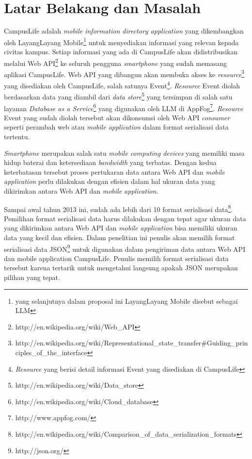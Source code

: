 \documentclass[a4paper, 12pt]{report}
\begin{document}
\section*{Latar Belakang dan Masalah}
\onehalfspacing CampusLife adalah \textit{mobile information directory application} yang dikembangkan oleh LayangLayang Mobile\footnote{yang selanjutnya dalam proposal ini LayangLayang Mobile disebut sebagai LLM} untuk menyediakan informasi yang relevan kepada civitas kampus. Setiap informasi yang ada di CampusLife akan didistribusikan melalui Web API\footnote{http://en.wikipedia.org/wiki/Web\_API} ke seluruh pengguna \textit{smartphone} yang sudah memasang aplikasi CampusLife. Web API yang dibangun akan membuka akses ke \textit{resource}\footnote{http://en.wikipedia.org/wiki/Representational\_state\_transfer\#Guiding\_principles\_of\_the\_interface} yang disediakan oleh CampusLife, salah satunya Event\footnote{\textit{Resource} yang berisi detail informasi Event yang disediakan di CampusLife}. \textit{Resource} Event diolah berdasarkan data yang diambil dari \textit{data store}\footnote{http://en.wikipedia.org/wiki/Data\_store} yang tersimpan di salah satu layanan \textit{Database as a Service}\footnote{http://en.wikipedia.org/wiki/Cloud\_database} yang digunakan oleh LLM di AppFog\footnote{http://www.appfog.com/}. \textit{Resource} Event yang sudah diolah tersebut akan dikonsumsi oleh Web API \textit{consumer} seperti perambah web atau \textit{mobile application} dalam format serialisasi data tertentu.

\onehalfspacing \textit{Smartphone} merupakan salah satu \textit{mobile computing devices} yang memiliki masa hidup baterai dan ketersediaan \textit{bandwidth} yang terbatas.\cite{challenging-issues-and-limitations-of-mobile-computing} Dengan kedua keterbatasan tersebut proses pertukaran data antara Web API dan \textit{mobile application} perlu dilakukan dengan efisien dalam hal ukuran data yang dikirimkan antara Web API dan \textit{mobile application}.

\onehalfspacing Sampai awal tahun 2013 ini, sudah ada lebih dari 10 format serialisasi data\footnote{http://en.wikipedia.org/wiki/Comparison\_of\_data\_serialization\_formats}. Pemilihan format serialisasi data harus dilakukan dengan tepat agar ukuran data yang dikirimkan antara Web API dan \textit{mobile application} bisa memiliki ukuran data yang kecil dan efisien. Dalam penelitian ini penulis akan memilih format serialisasi data JSON\footnote{http://json.org/} untuk digunakan dalam pengiriman data antara Web API dan mobile application CampusLife. Penulis memilih format serialisasi data tersebut karena tertarik untuk mengetahui langsung apakah JSON merupakan pilihan yang tepat. \cite{json-vs-xml-debate}
\end{document}
